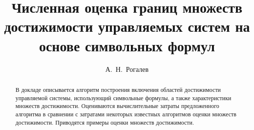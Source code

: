 
\usepackage{todonotes} %

\usepackage[russian]{nla}

%
%


%




%
\fi

\title{Численная оценка границ множеств достижимости управляемых систем на основе символьных формул}
\author{А.~Н.~Рогалев  %
} %


\maketitle

\begin{abstract}
В докладе описывается алгоритм построения включения областей достижимости управляемой системы, использующий символьные формулы, а также характеристики множеств достижимости. Оцениваются вычислительные затраты предложенного алгоритма в сравнении с затратами некоторых известных алгоритмов оценки множеств достижимости.  Приводятся примеры оценки множеств достижимости.

\end{abstract}


